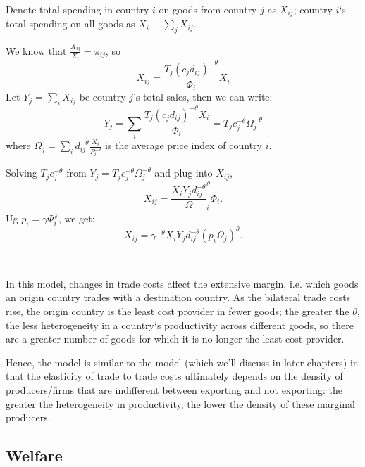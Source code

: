 \begin{note}
    \

    Denote total spending in country $i$ on goods from country $j$ as $X_{ij}$;
    country $i$`s total spending on all goods as $X_i \equiv \sum_j X_{ij}$.

    We know that $\frac{X_{ij}}{X_i} = \pi_{ij}$, so
    \[
    X_{ij} = \frac{T_j (c_j d_{ij})^{-\theta}}{\Phi_i} X_i
    \]
    Let $Y_j = \sum_i X_{ij}$ be country $j$'s total sales, then we can write:
    \[
    Y_j = \sum_i \frac{T_j (c_j d_{ij})^{-\theta} X_i}{\Phi_i} = T_j c_j^{-\theta} \Omega_j^{-\theta}
    \]
    where $\Omega_j = \sum_i d_{ij}^{-\theta} \frac{X_i}{P_i^{-\theta}}$ is the average price index of country $i$.

    Solving $T_j c_j^{-\theta}$ from $Y_j = T_j c_j^{-\theta} \Omega_j^{-\theta}$ and plug into $X_{ij}$,
    \[
    X_{ij} = \frac{X_i Y_j d_{ij}^{-\theta} }\Omega_i^{\theta}{\Phi_i}.
    \]
    Ug $p_i = \gamma \Phi_i^{\frac{1}{\theta}}$, we get:
    \[
    X_{ij} = \gamma^{-\theta} X_i Y_j d_{ij}^{-\theta} (p_i \Omega_j)^{\theta}. \label{eq:EKgravity}
    \]
\end{note}

\begin{remark}
    \

    In this model, changes in trade costs affect the extensive margin, i.e. which goods an origin country trades with a destination country. 
    As the bilateral trade costs rise, the origin country is the least cost provider in fewer goods;
    the greater the $\theta$, the less heterogeneity in a country`s productivity across different goods,
    so there are a greater number of goods for which it is no longer the least cost provider.

    Hence, the \cite{eaton2002technology} model is similar to the \cite{melitz2003impact} model 
    (which we'll discuss in later chapters) in that the elasticity of trade to trade costs ultimately depends on the density of producers/firms
    that are indifferent between exporting and not exporting: the greater the heterogeneity in productivity, 
    the lower the density of these marginal producers.
\end{remark}

\subsection{Welfare}


